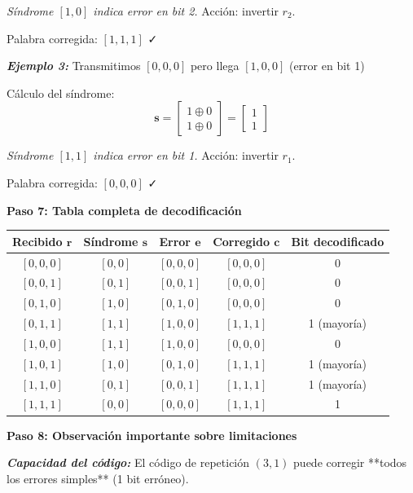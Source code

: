\documentclass[11pt,a4paper]{article}
\begin{document}
\textit{S\'indrome $[1,0]$ indica error en bit 2.} Acci\'on: invertir $r_2$.

Palabra corregida: $[1,1,1]$ ✓

\vspace{0.3cm}

\textit{\textbf{Ejemplo 3:}} Transmitimos $[0,0,0]$ pero llega $[1,0,0]$ (error en bit 1)

C\'alculo del s\'indrome:
\[
\mathbf{s} = \begin{bmatrix}
1 \oplus 0 \\
1 \oplus 0
\end{bmatrix} = \begin{bmatrix}
1 \\
1
\end{bmatrix}
\]

\textit{S\'indrome $[1,1]$ indica error en bit 1.} Acci\'on: invertir $r_1$.

Palabra corregida: $[0,0,0]$ ✓

\textbf{Paso 7: Tabla completa de decodificaci\'on}

\begin{center}
\small
\begin{tabular}{|c|c|c|c|c|}
\hline
\textbf{Recibido $\mathbf{r}$} & \textbf{S\'indrome $\mathbf{s}$} & \textbf{Error $\mathbf{e}$} & \textbf{Corregido $\mathbf{c}$} & \textbf{Bit decodificado} \\
\hline
$[0, 0, 0]$ & $[0, 0]$ & $[0, 0, 0]$ & $[0, 0, 0]$ & 0 \\
$[0, 0, 1]$ & $[0, 1]$ & $[0, 0, 1]$ & $[0, 0, 0]$ & 0 \\
$[0, 1, 0]$ & $[1, 0]$ & $[0, 1, 0]$ & $[0, 0, 0]$ & 0 \\
$[0, 1, 1]$ & $[1, 1]$ & $[1, 0, 0]$ & $[1, 1, 1]$ & 1 (mayor\'ia) \\
\hline
$[1, 0, 0]$ & $[1, 1]$ & $[1, 0, 0]$ & $[0, 0, 0]$ & 0 \\
$[1, 0, 1]$ & $[1, 0]$ & $[0, 1, 0]$ & $[1, 1, 1]$ & 1 (mayor\'ia) \\
$[1, 1, 0]$ & $[0, 1]$ & $[0, 0, 1]$ & $[1, 1, 1]$ & 1 (mayor\'ia) \\
$[1, 1, 1]$ & $[0, 0]$ & $[0, 0, 0]$ & $[1, 1, 1]$ & 1 \\
\hline
\end{tabular}
\end{center}

\textbf{Paso 8: Observaci\'on importante sobre limitaciones}

\textit{\textbf{Capacidad del c\'odigo:}} El c\'odigo de repetici\'on $(3,1)$ puede corregir **todos los errores simples** (1 bit err\'oneo).
\end{document}
